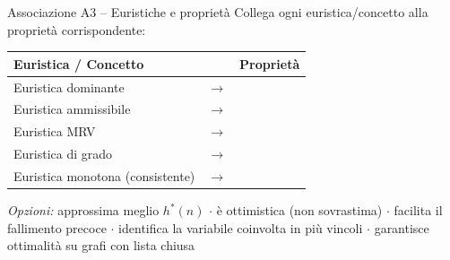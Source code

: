 \documentclass[12pt,a4paper]{article}
\begin{document}
\begin{assocbox}{Associazione A3 -- Euristiche e proprietà}
Collega ogni euristica/concetto alla proprietà corrispondente:

\begin{center}
\renewcommand{\arraystretch}{1.5}
\begin{tabular}{lll}
\textbf{Euristica / Concetto} & & \textbf{Proprietà} \\
\hline
Euristica dominante & $\longrightarrow$ & \underline{\hspace{5cm}} \\
Euristica ammissibile & $\longrightarrow$ & \underline{\hspace{5cm}} \\
Euristica MRV & $\longrightarrow$ & \underline{\hspace{5cm}} \\
Euristica di grado & $\longrightarrow$ & \underline{\hspace{5cm}} \\
Euristica monotona (consistente) & $\longrightarrow$ & \underline{\hspace{5cm}} \\
\end{tabular}
\end{center}

\smallskip
\textit{Opzioni:} approssima meglio $h^*(n)$ $\cdot$ è ottimistica (non sovrastima) $\cdot$ facilita il fallimento precoce $\cdot$ identifica la variabile coinvolta in più vincoli $\cdot$ garantisce ottimalità su grafi con lista chiusa
\end{assocbox}
\end{document}
